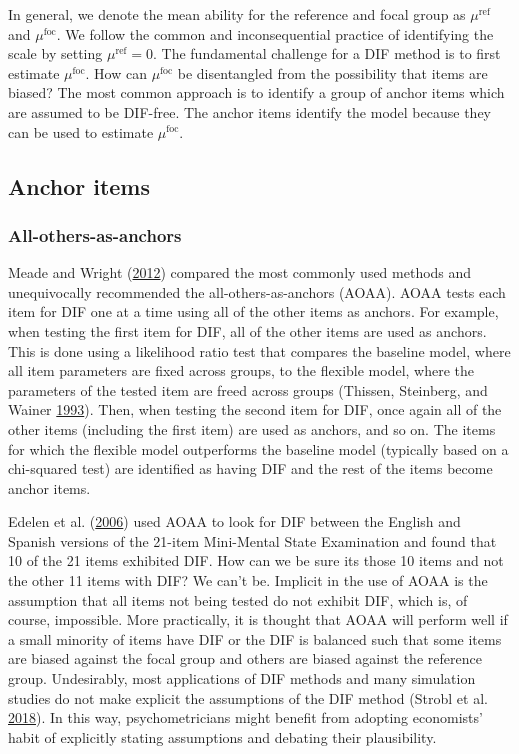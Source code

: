 \documentclass[
  11pt,
]{article}
\begin{document}
In general, we denote the mean ability for the reference and focal group as \(\mu^\text{ref}\) and \(\mu^\text{foc}\). We follow the common and inconsequential practice of identifying the scale by setting \(\mu^\text{ref} = 0\). The fundamental challenge for a DIF method is to first estimate \(\mu^\text{foc}\). How can \(\mu^\text{foc}\) be disentangled from the possibility that items are biased? The most common approach is to identify a group of anchor items which are assumed to be DIF-free. The anchor items identify the model because they can be used to estimate \(\mu^\text{foc}\).

\hypertarget{anchor-items}{%
\subsection{Anchor items}\label{anchor-items}}

\hypertarget{all-others-as-anchors}{%
\subsubsection{All-others-as-anchors}\label{all-others-as-anchors}}

Meade and Wright (\protect\hyperlink{ref-meade2012solving}{2012}) compared the most commonly used methods and unequivocally recommended the all-others-as-anchors (AOAA). AOAA tests each item for DIF one at a time using all of the other items as anchors. For example, when testing the first item for DIF, all of the other items are used as anchors. This is done using a likelihood ratio test that compares the baseline model, where all item parameters are fixed across groups, to the flexible model, where the parameters of the tested item are freed across groups (Thissen, Steinberg, and Wainer \protect\hyperlink{ref-thissen1993detection}{1993}). Then, when testing the second item for DIF, once again all of the other items (including the first item) are used as anchors, and so on. The items for which the flexible model outperforms the baseline model (typically based on a chi-squared test) are identified as having DIF and the rest of the items become anchor items.

Edelen et al. (\protect\hyperlink{ref-edelen2006identification}{2006}) used AOAA to look for DIF between the English and Spanish versions of the 21-item Mini-Mental State Examination and found that 10 of the 21 items exhibited DIF. How can we be sure its those 10 items and not the other 11 items with DIF? We can't be. Implicit in the use of AOAA is the assumption that all items not being tested do not exhibit DIF, which is, of course, impossible. More practically, it is thought that AOAA will perform well if a small minority of items have DIF or the DIF is balanced such that some items are biased against the focal group and others are biased against the reference group. Undesirably, most applications of DIF methods and many simulation studies do not make explicit the assumptions of the DIF method (Strobl et al. \protect\hyperlink{ref-strobl2018anchor}{2018}). In this way, psychometricians might benefit from adopting economists' habit of explicitly stating assumptions and debating their plausibility.
\end{document}
